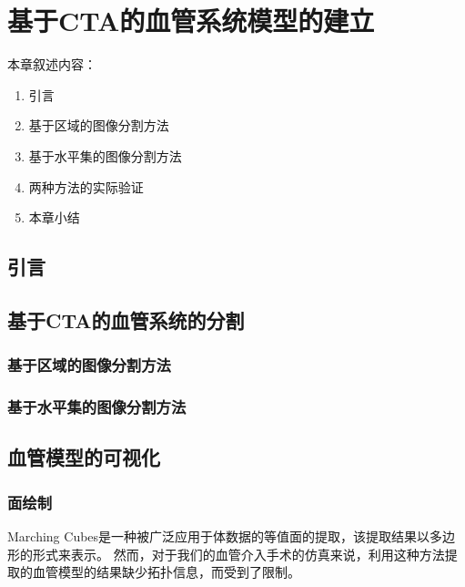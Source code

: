 \chapter{基于CTA的血管系统模型的建立}
\label{chap3} \fontsize{12pt}{12pt}\selectfont

本章叙述内容：
\begin{enumerate}
  \item 引言
  \item 基于区域的图像分割方法
  \item 基于水平集的图像分割方法
  \item 两种方法的实际验证
  \item 本章小结
\end{enumerate}

\section{引言}

\section{基于CTA的血管系统的分割}

\subsection{基于区域的图像分割方法}

\subsection{基于水平集的图像分割方法}


\section{血管模型的可视化}

\subsection{面绘制}

Marching Cubes\cite{Lorensen1987MC}是一种被广泛应用于体数据的等值面的提取，该提取结果以多边形的形式来表示。
然而，对于我们的血管介入手术的仿真来说，利用这种方法提取的血管模型的结果缺少拓扑信息，而受到了限制\cite{Nowinski2001NeuroCath}\cite{Hahn1998GWU}。

